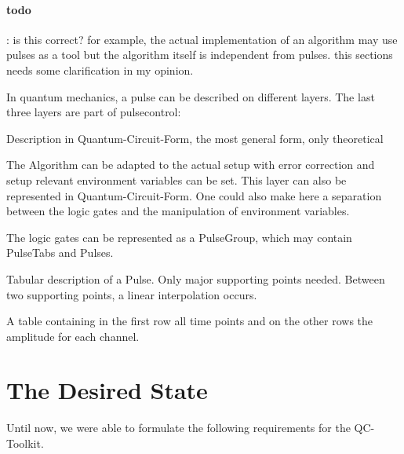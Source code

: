 \documentclass[a4paper,12pt]{article}
\begin{document}
\paragraph{ todo}: is this correct? for example, the actual implementation of an algorithm may use pulses as a tool but the algorithm itself is independent from pulses. this sections needs some clarification in my opinion.\par
In quantum mechanics, a pulse can be described on different layers. The last three layers are part of pulsecontrol:
\begin{description} \itemsep-0.5pt
 \item[Algorithm:] Description in Quantum-Circuit-Form, the most general form, only theoretical
 \item[Optimized Algorithm:] The Algorithm can be adapted to the actual setup with error correction and setup relevant environment variables can be set.
 This layer can also be represented in Quantum-Circuit-Form. One could also make here a separation between the logic gates and the manipulation of environment variables.
 \item[PulseGroup:] The logic gates can be represented as a PulseGroup, which may contain PulseTabs and Pulses.
 \item[PulseTab:] Tabular description of a Pulse. Only major supporting points needed. Between two supporting points, a linear interpolation occurs.
 \item[Pulse:] A table containing in the first row all time points and on the other rows the amplitude for each channel.
\end{description}

\section{The Desired State}
Until now, we were able to formulate the following requirements for the QC-Toolkit.
\end{document}
